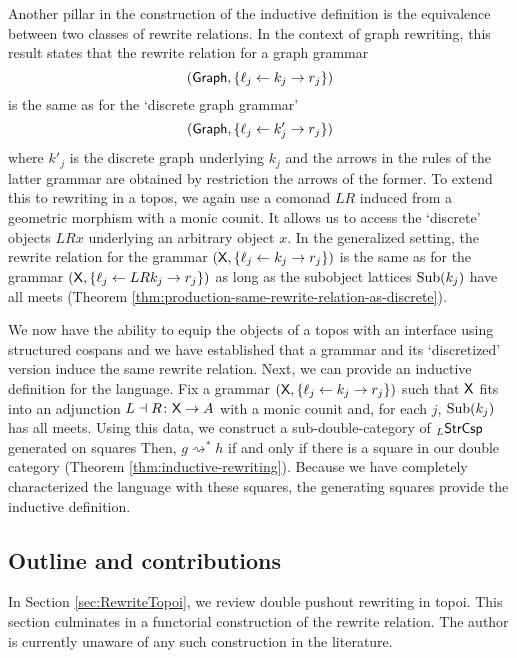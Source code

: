 \documentclass[oneside]{amsart}
\begin{document}
Another pillar in the construction of the inductive
definition is the equivalence between two classes of rewrite
relations.  In the context of graph rewriting, this result
states that the rewrite relation for a graph grammar
$$(\mathsf{Graph} , \{ \ell_j \leftarrow k_j \to r_j\})$$ is the same as for the `discrete graph
grammar'
$$( \mathsf{Graph} , \{ \ell_j \leftarrow k'_j \to r_j\})$$ where $ k'_j $ is the discrete graph
underlying $ k_j $ and the arrows in the rules of the latter
grammar are obtained by restriction the arrows of
the former.  To extend this to rewriting in a topos, we
again use a comonad $ LR $ induced from a geometric morphism
with a monic counit. It allows us to access the `discrete'
objects $ LRx $ underlying an arbitrary object $ x $.  In
the generalized setting, the rewrite relation for the
grammar $ ( \mathsf{X}, \{ \ell_j \leftarrow k_j \to r_j\}) $ is the same
as for the grammar
$ (\mathsf{X} , \{ \ell_j \leftarrow LR k_j \to r_j\}) $ as long as the
subobject lattices $ \operatorname{Sub} (k_j) $ have all meets (Theorem
\ref{thm:production-same-rewrite-relation-as-discrete}).

We now have the ability to equip the objects of a
topos with an interface using structured cospans
and we have established that a grammar and its
`discretized' version induce the same rewrite relation.
Next, we can provide an inductive definition for
the language. Fix a grammar
$ (\mathsf{X}, \{ \ell_j \leftarrow k_j \to r_j\}) $
such that $ \mathsf{X} $ fits into an adjunction
$ L \dashv R \colon \mathsf{X} \to A $ with a monic counit
and, for each $ j $, $ \operatorname{Sub} (k_j) $ has all meets.
Using this data, we construct a
sub-double-category of $ _L\mathsf{StrCsp} $ generated on
squares 
Then, $ g \rightsquigarrow^\ast h$ if and only
if there is a square
 in our double
category (Theorem \ref{thm:inductive-rewriting}).
Because we have completely characterized the
language with these squares, the generating
squares provide the inductive definition. 

\subsection{Outline and contributions}
\label{sec:outl-contr}

In Section \ref{sec:RewriteTopoi}, we review
double pushout rewriting in topoi. This section
culminates in a functorial construction of the
rewrite relation.  The author is currently unaware
of any such construction in the literature.
\end{document}
